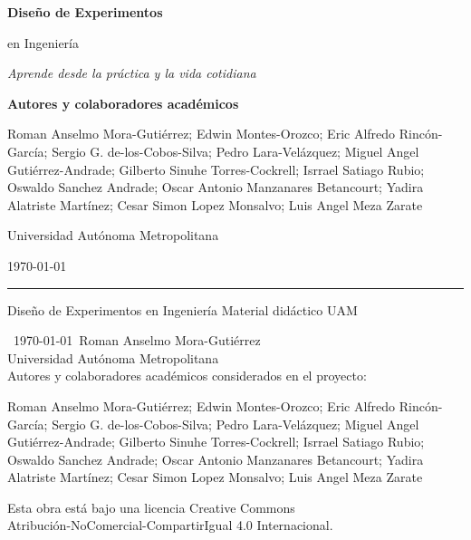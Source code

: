 \documentclass[compacto,10pt,comentarios]{aleph-notas}
\newcommand{\autoresproyecto}{%
Roman Anselmo Mora-Gutiérrez;
Edwin Montes-Orozco;
Eric Alfredo Rincón-García;
Sergio G. de-los-Cobos-Silva;
Pedro Lara-Velázquez;
Miguel Angel Gutiérrez-Andrade;
Gilberto Sinuhe Torres-Cockrell;
Isrrael Satiago Rubio;
Oswaldo Sanchez Andrade;
Oscar Antonio Manzanares Betancourt;
Yadira Alatriste Martínez;
Cesar Simon Lopez Monsalvo;
Luis Angel Meza Zarate}
\begin{document}
\begin{titlepage}
    \centering
    \vspace*{1cm}
    
    {\Huge\bfseries\color{colorprincipal} Diseño de Experimentos\par}
    {\huge en Ingeniería\par}
    \vspace{0.5cm}
    {\Large\textit{Aprende desde la práctica y la vida cotidiana}\par}
    \vspace{2cm}
    
    {\Large \textbf{Autores y colaboradores académicos}\par}
    \vspace{0.35cm}
    {\normalsize
    \begin{minipage}{0.86\textwidth}
    \centering
    \autoresproyecto
    \end{minipage}
    \par}
    \vspace{0.3cm}
    {\large Universidad Autónoma Metropolitana\par}
    \vspace{1cm}
    
    {\large \today\par}
    \vfill
    
    \rule{0.8\textwidth}{0.5pt}
    \vspace{0.3cm}
    {\small Diseño de Experimentos en Ingeniería \textbullet{} Material didáctico \textbullet{} UAM}
\end{titlepage}

\encabezado

\newpage
\thispagestyle{empty}
\vspace*{\fill}
\begin{center}
    \small
    \textcopyright\ \today\ Roman Anselmo Mora-Gutiérrez \\
    Universidad Autónoma Metropolitana \\
    \vspace{0.5cm}
    Autores y colaboradores académicos considerados en el proyecto: \\
    \vspace{0.2cm}
    \begin{minipage}{0.86\textwidth}
    \centering
    \autoresproyecto
    \end{minipage}
    \vspace{0.6cm}

    Esta obra está bajo una licencia Creative Commons \\
    Atribución-NoComercial-CompartirIgual 4.0 Internacional.
\end{center}
\vspace*{1cm}
\newpage
\end{document}
